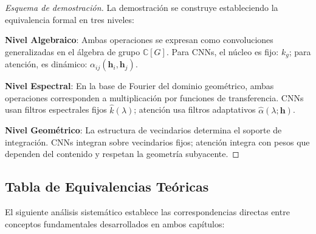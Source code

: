 \begin{proof}[Esquema de demostración]
La demostración se construye estableciendo la equivalencia formal en tres niveles:

\textbf{Nivel Algebraico}: Ambas operaciones se expresan como convoluciones generalizadas en el álgebra de grupo $\mathbb{C}[G]$. Para CNNs, el núcleo es fijo: $k_g$; para atención, es dinámico: $\alpha_{ij}(\mathbf{h}_i, \mathbf{h}_j)$.

\textbf{Nivel Espectral}: En la base de Fourier del dominio geométrico, ambas operaciones corresponden a multiplicación por funciones de transferencia. CNNs usan filtros espectrales fijos $\hat{k}(\lambda)$; atención usa filtros adaptativos $\hat{\alpha}(\lambda; \mathbf{h})$.

\textbf{Nivel Geométrico}: La estructura de vecindarios determina el soporte de integración. CNNs integran sobre vecindarios fijos; atención integra con pesos que dependen del contenido y respetan la geometría subyacente.
\end{proof}

\subsection{Tabla de Equivalencias Teóricas}\label{subsec:tabla_equivalencias}

El siguiente análisis sistemático establece las correspondencias directas entre conceptos fundamentales desarrollados en ambos capítulos:

